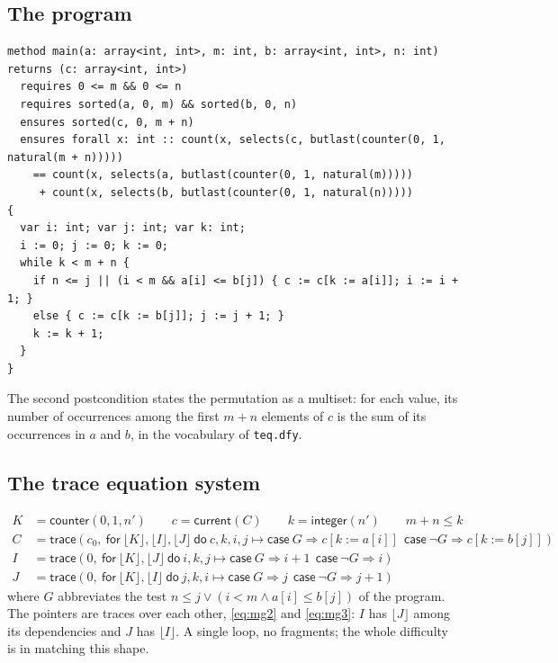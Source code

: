 \documentclass[11pt,a4paper]{article}
\newcommand{\bl}[1]{\lfloor #1\rfloor}                       %
\newcommand{\tr}[3]{\mathsf{trace}(#1,\ \mathsf{for}\ #2\ \mathsf{do}\ #3)}
\newcommand{\cnt}{\mathsf{counter}}
\newcommand{\cur}{\mathsf{current}}
\newcommand{\intf}{\mathsf{integer}}
\newcommand{\upd}[2]{\mathsf{case}\ #1 \Rightarrow #2}
\begin{document}
\subsection{The program}
\begin{lstlisting}
method main(a: array<int, int>, m: int, b: array<int, int>, n: int) returns (c: array<int, int>)
  requires 0 <= m && 0 <= n
  requires sorted(a, 0, m) && sorted(b, 0, n)
  ensures sorted(c, 0, m + n)
  ensures forall x: int :: count(x, selects(c, butlast(counter(0, 1, natural(m + n)))))
    == count(x, selects(a, butlast(counter(0, 1, natural(m)))))
     + count(x, selects(b, butlast(counter(0, 1, natural(n)))))
{
  var i: int; var j: int; var k: int;
  i := 0; j := 0; k := 0;
  while k < m + n {
    if n <= j || (i < m && a[i] <= b[j]) { c := c[k := a[i]]; i := i + 1; }
    else { c := c[k := b[j]]; j := j + 1; }
    k := k + 1;
  }
}
\end{lstlisting}
The second postcondition states the permutation as a multiset: for each value, its number of occurrences
among the first $m + n$ elements of $c$ is the sum of its occurrences in $a$ and $b$, in the vocabulary of
\texttt{teq.dfy}.

\subsection{The trace equation system}
\begin{align}
  K &= \cnt(0, 1, n') \qquad c = \cur(C) \qquad k = \intf(n') \qquad m + n \le k \label{eq:mg0}\\
  C &= \tr{c_0}{\bl{K}, \bl{I}, \bl{J}}{c, k, i, j \mapsto \upd{G}{c[k := a[i]]}\ \ \upd{\neg G}{c[k := b[j]]}} \label{eq:mg1}\\
  I &= \tr{0}{\bl{K}, \bl{J}}{i, k, j \mapsto \upd{G}{i + 1}\ \ \upd{\neg G}{i}} \label{eq:mg2}\\
  J &= \tr{0}{\bl{K}, \bl{I}}{j, k, i \mapsto \upd{G}{j}\ \ \upd{\neg G}{j + 1}} \label{eq:mg3}
\end{align}
where $G$ abbreviates the test $n \le j \vee (i < m \wedge a[i] \le b[j])$ of the program. The pointers
are traces over each other, \eqref{eq:mg2} and \eqref{eq:mg3}: $I$ has $\bl{J}$ among its dependencies and $J$ has $\bl{I}$. A single loop,
no fragments; the whole difficulty is in matching this shape.
\end{document}
